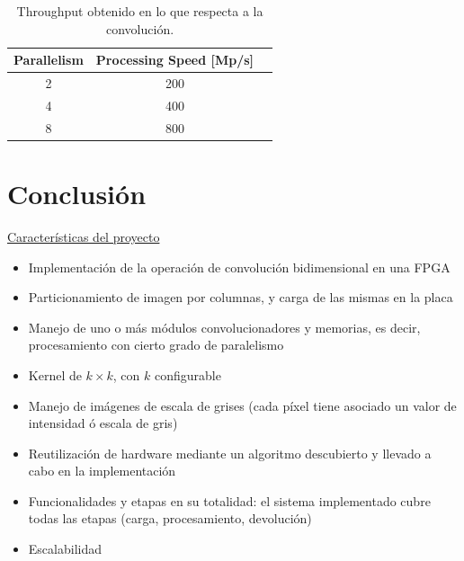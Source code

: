 \documentclass[]{IEEEphot}
\begin{document}
\begin{table}[H]
\renewcommand{\arraystretch}{1.3}
\caption{Throughput obtenido en lo que respecta a la convolución.}
\label{conv_tp}
\centering
\begin{tabular}{|c|c|c|}
 \hline
  \textbf{Parallelism}  &    \textbf{Processing Speed [Mp/s]}  \\ \hline
          2             &                     200              \\ \hline
          4             &                     400              \\ \hline
          8             &                     800              \\ \hline
\end{tabular}           
\end{table}


\section{Conclusión}  \label{conclusion_sec}

\underline{Características del proyecto}
\begin{frame}{}
    
      \begin{itemize}
        \item Implementación de la operación de convolución bidimensional en una FPGA
        \item Particionamiento de imagen por columnas, y carga de las mismas en la placa
        \item Manejo de uno o más módulos convolucionadores y memorias, es decir, procesamiento con cierto grado de paralelismo
        \item Kernel de $ k \times k$, con $k$ configurable
        \item Manejo de imágenes de escala de grises (cada píxel tiene asociado un valor de intensidad ó escala de gris)
        \item Reutilización de hardware mediante un algoritmo descubierto y llevado a cabo en la implementación
        \item Funcionalidades y etapas en su totalidad: el sistema implementado cubre todas las etapas (carga, procesamiento, devolución)
        \item Escalabilidad
      \end{itemize}
    
\end{frame}
\end{document}
